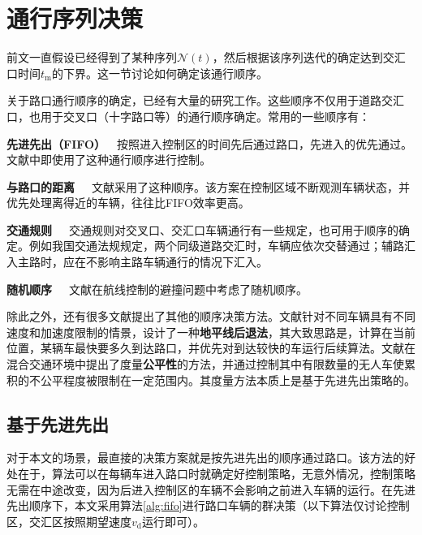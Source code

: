 
\section{通行序列决策}
前文一直假设已经得到了某种序列$\mathcal{N}(t)$，然后根据该序列迭代的确定达到交汇口时间$t_\mathrm{m}$的下界。这一节讨论如何确定该通行顺序。

关于路口通行顺序的确定，已经有大量的研究工作。这些顺序不仅用于道路交汇口，也用于交叉口（十字路口等）的通行顺序确定。常用的一些顺序有：

\textbf{先进先出（FIFO）}\ \ 按照进入控制区的时间先后通过路口，先进入的优先通过。文献中即使用了这种通行顺序进行控制。

\textbf{与路口的距离}\ \ \ 文献采用了这种顺序。该方案在控制区域不断观测车辆状态，并优先处理离得近的车辆，往往比FIFO效率更高。

\textbf{交通规则}\ \ \ 交通规则对交叉口、交汇口车辆通行有一些规定，也可用于顺序的确定。例如我国交通法规规定，两个同级道路交汇时，车辆应依次交替通过；辅路汇入主路时，应在不影响主路车辆通行的情况下汇入。

\textbf{随机顺序}\ \ \ 文献在航线控制的避撞问题中考虑了随机顺序。

除此之外，还有很多文献提出了其他的顺序决策方法。文献针对不同车辆具有不同速度和加速度限制的情景，设计了一种\textbf{地平线后退法}，其大致思路是，计算在当前位置，某辆车最快要多久到达路口，并优先对到达较快的车运行后续算法。文献在混合交通环境中提出了度量\textbf{公平性}的方法，并通过控制其中有限数量的无人车使累积的不公平程度被限制在一定范围内。其度量方法本质上是基于先进先出策略的。

\subsection{基于先进先出}
对于本文的场景，最直接的决策方案就是按先进先出的顺序通过路口。该方法的好处在于，算法可以在每辆车进入路口时就确定好控制策略，无意外情况，控制策略无需在中途改变，因为后进入控制区的车辆不会影响之前进入车辆的运行。在先进先出顺序下，本文采用算法\eqref{alg:fifo}进行路口车辆的群决策（以下算法仅讨论控制区，交汇区按照期望速度$v_\mathrm{d}$运行即可）。

